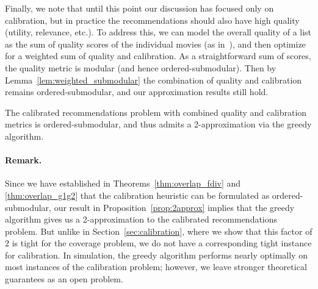 Finally, we note that until this point our discussion has focused only on calibration, but in practice the recommendations should also have high quality (utility, relevance, etc.). To address this, we can model the overall quality of a list as the sum of quality scores of the individual movies (as in~\cite{ashkan2015, Steck18}), and then optimize for a weighted sum of quality and calibration. As a straightforward sum of scores, the quality metric is modular (and hence ordered-submodular). Then by Lemma~\ref{lem:weighted_submodular} the combination of quality and calibration remains ordered-submodular, and our approximation results still hold.

\begin{cor}
The calibrated recommendations problem with combined quality and calibration metrics is ordered-submodular, and thus admits a 2-approximation via the greedy algorithm.
\end{cor}

\paragraph{Remark.} Since we have established in Theorems~\ref{thm:overlap_fdiv} and \ref{thm:overlap_g1g2} that the calibration heuristic can be formulated as ordered-submodular, our result in Proposition~\ref{prop:2approx} implies that the greedy algorithm gives us a 2-approximation to the calibrated recommendations problem. But unlike in Section~\ref{sec:calibration}, where we show that this factor of $2$ is tight for the coverage problem, we do not have a corresponding tight instance for calibration.   In simulation, the greedy algorithm performs nearly optimally on most instances of the calibration problem; however, we leave stronger theoretical guarantees as an open problem.


% 